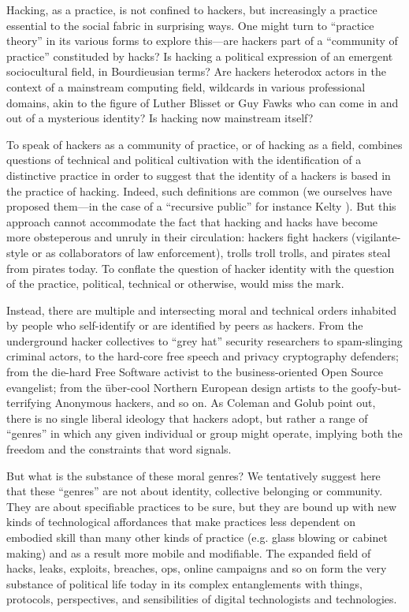 \documentclass[10pt,letter,oneside]{scrartcl}
\begin{document}
Hacking, as a practice, is not confined to hackers, but increasingly a practice
essential to the social fabric in surprising ways.  One might turn to ``practice
theory'' in its various forms to explore this---are hackers part of a
``community of practice'' constituded by hacks?  Is hacking a political expression 
of an emergent sociocultural field, in Bourdieusian terms? Are hackers heterodox 
actors in the context of a mainstream computing field, wildcards in various 
professional domains, akin to the figure of Luther Blisset or Guy Fawks who 
can come in and out of a mysterious identity?  Is hacking now mainstream 
itself?

To speak of hackers as a community of practice, or of hacking as a field,
combines questions of technical and political cultivation with the
identification of a distinctive practice in order to suggest that the identity
of a hackers is based in the practice of hacking.  Indeed, such definitions are
common (we ourselves have proposed them---in the case of a ``recursive public''
for instance Kelty \cite*{kelty_two_2008}).  But this approach cannot 
accommodate the fact that hacking and hacks have become more obsteperous 
and unruly in their circulation: hackers fight hackers (vigilante-style or
as collaborators of law enforcement), trolls troll trolls, and pirates steal 
from pirates today.  To conflate the question of hacker identity with the 
question of the practice, political, technical or otherwise, would miss the 
mark.

Instead, there are multiple and intersecting moral and technical orders 
inhabited by people who self-identify or are identified by peers as hackers. 
From the underground hacker collectives to ``grey hat'' security researchers 
to spam-slinging criminal actors, to the hard-core free speech and privacy 
cryptography defenders; from the die-hard Free Software activist to the 
business-oriented Open Source evangelist; from the über-cool Northern 
European design artists to the goofy-but-terrifying Anonymous hackers, 
and so on.  As Coleman and Golub \cite*{coleman_hacker_2008} point out, 
there is no single liberal ideology that hackers adopt, but rather a 
range of ``genres'' in which any given individual or group might 
operate, implying both the freedom and the constraints that word signals.

But what is the substance of these moral genres?  We tentatively suggest here 
that these ``genres'' are not about identity, collective belonging or community.  
They are about specifiable practices to be sure, but they are bound up with new
kinds of technological affordances that make practices less dependent on
embodied skill than many other kinds of practice (e.g. glass blowing or cabinet
making) and as a result more mobile and modifiable.  The expanded field of
hacks, leaks, exploits, breaches, ops, online campaigns and so on form the very
substance of political life today in its complex entanglements with things,
protocols, perspectives, and sensibilities of digital technologists and
technologies. 
\end{document}
